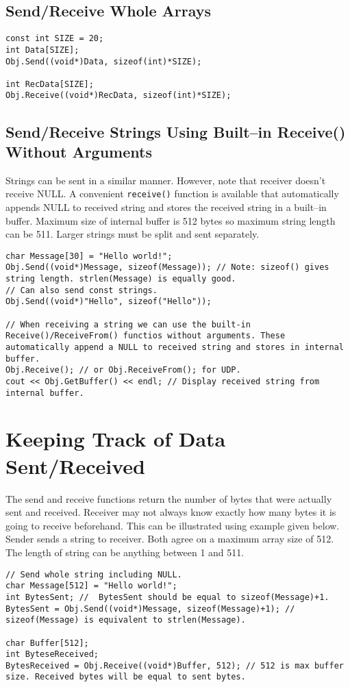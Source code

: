 \documentclass[12pt,a4paper]{article}
\begin{document}
\subsection{Send/Receive Whole Arrays}
\begin{lstlisting}
const int SIZE = 20;
int Data[SIZE];
Obj.Send((void*)Data, sizeof(int)*SIZE);

int RecData[SIZE];
Obj.Receive((void*)RecData, sizeof(int)*SIZE);
\end{lstlisting}
\subsection{Send/Receive Strings Using Built--in Receive() Without Arguments}
Strings can be sent in a similar manner. However, note that receiver doesn't receive NULL. A convenient \verb|receive()| function is available that automatically appends NULL to received string and stores the received string in a built--in buffer. Maximum size of internal buffer is 512 bytes so maximum string length can be 511. Larger strings must be split and sent separately.
\begin{lstlisting}
char Message[30] = "Hello world!";
Obj.Send((void*)Message, sizeof(Message)); // Note: sizeof() gives string length. strlen(Message) is equally good.
// Can also send const strings.
Obj.Send((void*)"Hello", sizeof("Hello"));

// When receiving a string we can use the built-in Receive()/ReceiveFrom() functios without arguments. These automatically append a NULL to received string and stores in internal buffer.
Obj.Receive(); // or Obj.ReceiveFrom(); for UDP.
cout << Obj.GetBuffer() << endl; // Display received string from internal buffer.
\end{lstlisting}
\section{Keeping Track of Data Sent/Received}
The send and receive functions return the number of bytes that were actually sent and received. Receiver may not always know exactly how many bytes it is going to receive beforehand. This can be illustrated using example given below. Sender sends a string to receiver. Both agree on a maximum array size of 512. The length of string can be anything between 1 and 511.
\begin{lstlisting}
// Send whole string including NULL.
char Message[512] = "Hello world!";
int BytesSent; //  BytesSent should be equal to sizeof(Message)+1.
BytesSent = Obj.Send((void*)Message, sizeof(Message)+1); // sizeof(Message) is equivalent to strlen(Message).

char Buffer[512];
int ByteseReceived;
BytesReceived = Obj.Receive((void*)Buffer, 512); // 512 is max buffer size. Received bytes will be equal to sent bytes.
\end{lstlisting}
\end{document}
